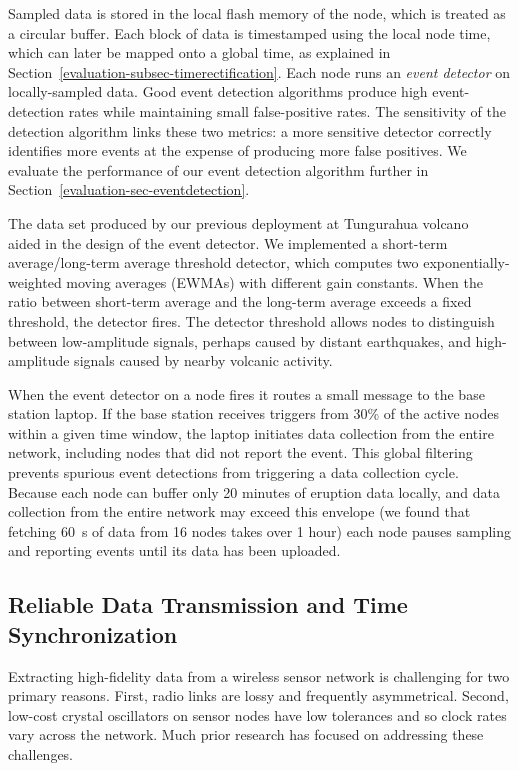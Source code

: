 Sampled data is stored in the local flash memory of the node, which is
treated as a circular buffer. Each block of data is timestamped using the
local node time, which can later be mapped onto a global time, as explained
in Section~\ref{evaluation-subsec-timerectification}. Each node runs an
\textit{event detector} on locally-sampled data. Good event detection
algorithms produce high event-detection rates while maintaining small
false-positive rates. The sensitivity of the detection algorithm links these
two metrics: a more sensitive detector correctly identifies more events at
the expense of producing more false positives. We evaluate the performance of
our event detection algorithm further in
Section~\ref{evaluation-sec-eventdetection}.

The data set produced by our previous deployment at Tungurahua
volcano~\cite{volcano-ewsn05} aided in the design of the event detector. We
implemented a short-term average/long-term average threshold detector, which
computes two exponentially-weighted moving averages (EWMAs) with different
gain constants. When the ratio between short-term average and the long-term
average exceeds a fixed threshold, the detector fires. The detector threshold
allows nodes to distinguish between low-amplitude signals, perhaps caused by
distant earthquakes, and high-amplitude signals caused by nearby volcanic
activity.

When the event detector on a node fires it routes a small message to the base
station laptop. If the base station receives triggers from 30\% of the active
nodes within a given time window, the laptop initiates data collection from
the entire network, including nodes that did not report the event. This
global filtering prevents spurious event detections from triggering a data
collection cycle. Because each node can buffer only 20 minutes of eruption
data locally, and data collection from the entire network may exceed this
envelope (we found that fetching 60~s of data from 16 nodes takes over 1
hour) each node pauses sampling and reporting events until its data has been
uploaded.

\subsection{Reliable Data Transmission and Time Synchronization}
\label{evaluation-subsec-fetch}

Extracting high-fidelity data from a wireless sensor network is challenging
for two primary reasons. First, radio links are lossy and frequently
asymmetrical. Second, low-cost crystal oscillators on sensor nodes have low
tolerances and so clock rates vary across the network. Much prior research
has focused on addressing these challenges.

